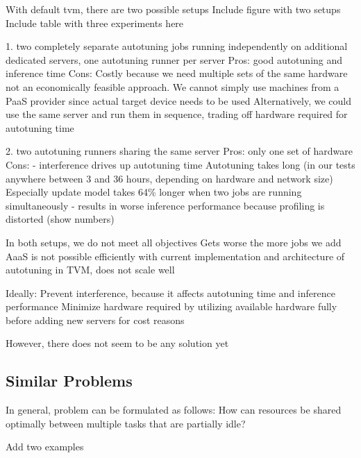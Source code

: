 With default tvm, there are two possible setups
Include figure with two setups
Include table with three experiments here

1. two completely separate autotuning jobs running independently on additional dedicated servers, one autotuning runner per server
Pros: good autotuning and inference time
Cons: Costly because we need multiple sets of the same hardware
not an economically feasible approach. We cannot simply use machines from a PaaS provider since actual target device needs to be used
Alternatively, we could use the same server and run them in sequence, trading off hardware required for autotuning time

2. two autotuning runners sharing the same server
Pros: only one set of hardware
Cons:
- interference drives up autotuning time
Autotuning takes long (in our tests anywhere between 3 and 36 hours, depending on hardware and network size)
Especially update model takes 64\% longer when two jobs are running simultaneously
- results in worse inference performance because profiling is distorted (show numbers)

In both setups, we do not meet all objectives
Gets worse the more jobs we add
AaaS is not possible efficiently with current implementation and architecture of autotuning in TVM, does not scale well

Ideally:
Prevent interference, because it affects autotuning time and inference performance
Minimize hardware required by utilizing available hardware fully before adding new servers for cost reasons

However, there does not seem to be any solution yet

\subsection{Similar Problems}
In general, problem can be formulated as follows:
How can resources be shared optimally between multiple tasks that are partially idle?

Add two examples